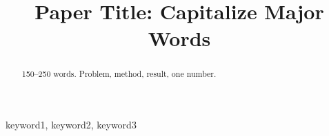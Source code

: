 \documentclass[conference]{IEEEtran}
\title{Paper Title: Capitalize Major Words}
\author{\IEEEauthorblockN{Anonymous Authors}
\IEEEauthorblockA{Paper ID 000}}
\author{\IEEEauthorblockN{First Author}
\IEEEauthorblockA{Dept., University\\
email@example.com}
\and
\IEEEauthorblockN{Second Author}
\IEEEauthorblockA{Dept., University\\
email@example.com}}
\begin{document}
\maketitle

\begin{abstract}
    150--250 words. Problem, method, result, one number.
\end{abstract}

\begin{IEEEkeywords}
    keyword1, keyword2, keyword3
\end{IEEEkeywords}








\end{document}
